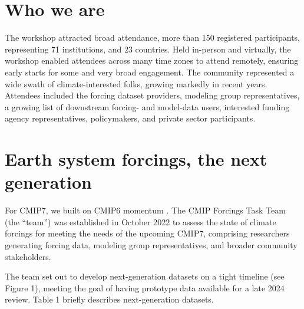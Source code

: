 \documentclass{ametsocV6.1}
\begin{document}
\section*{Who we are}
The workshop attracted broad attendance, more than 150 registered participants, representing 71 institutions, and 23 countries. Held in-person and virtually, the workshop enabled attendees across many time zones to attend remotely, ensuring early starts for some and very broad engagement. The community represented a wide swath of climate-interested folks, growing markedly in recent years. Attendees included the forcing dataset providers, modeling group representatives, a growing list of downstream forcing- and model-data users, interested funding agency representatives, policymakers, and private sector participants.

\section*{Earth system forcings, the next generation}
For CMIP7, we built on CMIP6 momentum \citep{durack_toward_2018}. The CMIP Forcings Task Team (the ``team'') was established in October 2022 to assess the state of climate forcings for meeting the needs of the upcoming CMIP7, comprising researchers generating forcing data, modeling group representatives, and broader community stakeholders.

The team set out to develop next-generation datasets on a tight timeline (see Figure 1), meeting the goal of having prototype data available for a late 2024 review. Table 1 briefly describes next-generation datasets.
\end{document}
